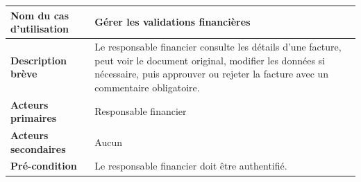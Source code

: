 \begin{table}[H]
	\centering
	\renewcommand{\arraystretch}{1.5}
	\small
	\begin{tabularx}{\textwidth}{|p{4.5cm}|X|}
		\hline
		\rowcolor{blue!20}
		\textbf{Nom du cas d’utilisation} & Gérer les validations financières \\ \hline
		
		\textbf{Description brève} & Le responsable financier consulte les détails d’une facture, peut voir le document original, modifier les données si nécessaire, puis approuver ou rejeter la facture avec un commentaire obligatoire. \\ \hline
		
		\textbf{Acteurs primaires} & Responsable financier \\ \hline
		
		\textbf{Acteurs secondaires} & Aucun \\ \hline
		
		\textbf{Pré-condition} & Le responsable financier doit être authentifié. \\ \hline
		

\end{tabularx}
\end{table}
